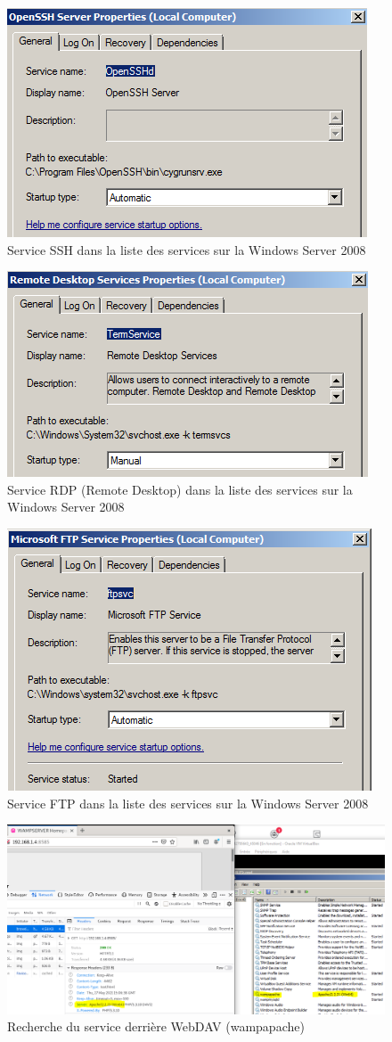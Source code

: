 \documentclass[a4paper]{article}
\begin{document}
\begin{figure}[H]
    \centering
    \includegraphics[width=0.50\linewidth]{images/zabbix-44.png}
    \caption{Service SSH dans la liste des services sur la Windows Server 2008}
    \label{fig:zabbix44}
\end{figure}
\begin{figure}[H]
    \centering
    \includegraphics[width=0.50\linewidth]{images/zabbix-48.png}
    \caption{Service RDP (Remote Desktop) dans la liste des services sur la Windows Server 2008}
    \label{fig:zabbix48}
\end{figure}
\begin{figure}[H]
    \centering
    \includegraphics[width=0.50\linewidth]{images/zabbix-49.png}
    \caption{Service FTP dans la liste des services sur la Windows Server 2008}
    \label{fig:zabbix49}
\end{figure}
\begin{figure}[H]
    \centering
    \includegraphics[width=0.95\linewidth]{images/zabbix-57.png}
    \caption{Recherche du service derrière WebDAV (wampapache)}
    \label{fig:zabbix57}
\end{figure}
\end{document}
